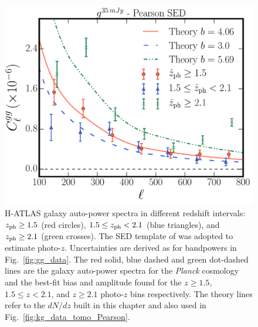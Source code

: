 \begin{figure} %
\centering %
\includegraphics[width=\textwidth]{Chapter4/Images/gg_ALL_2015_zbins_allcomparisons_Pearson_3sigma}
\caption{H-ATLAS galaxy auto-power spectra in different redshift intervals: $z_{\rm{ph}} \ge 1.5$ (red circles), $1.5 \le z_{\rm{ph}} < 2.1$ (blue triangles), and $z_{\rm{ph}}\ge 2.1$ (green crosses). The SED template of \cite{Pearson2013} was adopted to estimate photo-$z$. Uncertainties are derived as for bandpowers in Fig.~\eqref{fig:gg_data}. The red solid, blue dashed and green dot-dashed lines are the galaxy auto-power spectra for the \emph{Planck} cosmology and the best-fit bias and amplitude found for the $z \ge 1.5$, $1.5 \le z < 2.1$, and $z \ge 2.1$ photo-$z$ bins respectively. The theory lines refer to the $dN/dz$ built in this chapter and also used in Fig.~\eqref{fig:kg_data_tomo_Pearson}. \label{fig:gg_data_tomo_Pearson}}
\end{figure}

